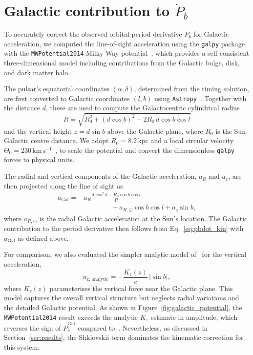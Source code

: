 \documentclass[
    floats,
    floatfix,
    amssymb,
    prd,
    twocolumn,
    superscriptaddress,
    nofootinbib,
    unicode,
    colorlinks=true,
    linktocpage=true
]{revtex4-2}
\begin{document}
\section{Galactic contribution to $\dot{P}_b$}
\label{app:pbdot_gal}

To accurately correct the observed orbital period derivative $\dot{P}_b$ 
for Galactic acceleration, we computed the line-of-sight acceleration 
using the \texttt{galpy} package with the 
\texttt{MWPotential2014} Milky Way potential~\cite{Bovy:2014vfa}, which provides a 
self-consistent three-dimensional model including contributions from the 
Galactic bulge, disk, and dark matter halo.

The pulsar's equatorial coordinates $(\alpha, \delta)$, determined from 
the timing solution, are first converted to Galactic coordinates $(l, b)$ 
using \texttt{Astropy}~\cite{2022ApJ...935..167A}. Together with the 
distance $d$, these are used to compute the Galactocentric cylindrical 
radius
\begin{equation}
    R = \sqrt{R_0^2 + (d\cos b)^2 - 2R_0\, d\cos b\cos l}
    \label{eq:galR}
\end{equation}
and the vertical height $z = d \sin b$ above the Galactic plane, where 
$R_0$ is the Sun--Galactic centre distance. We adopt 
$R_0 = 8.2\,\mathrm{kpc}$ and a local circular velocity $\Theta_0 = 
230\,\mathrm{km\,s^{-1}}$~\cite{10.1093/mnras/stac3529,2023A&A...676A.134P}, to scale the potential and 
convert the dimensionless \texttt{galpy} forces to physical units.

The radial and vertical components of the Galactic acceleration, $a_R$ 
and $a_z$, are then projected along the line of sight as
\begin{align}
    a_\mathrm{Gal} = &a_R \frac{d\cos^2 b - R_0 \cos b \cos l}{R} \nonumber \\
    &\qquad \qquad + a_{R,\odot}\cos b \cos l + a_z \sin b,
    \label{eq:agal_proj}
\end{align}
where $a_{R,\odot}$ is the radial Galactic acceleration at the Sun's 
location. The Galactic contribution to the period derivative then follows 
from Eq.~\eqref{eq:pbdot_kin} with $a_\mathrm{Gal}$ as defined above.

For comparison, we also evaluated the simpler analytic model of~\citet{2009MNRAS.400..805L} for the vertical acceleration,
\begin{equation}
    a_\mathrm{z,\,analytic} = -\frac{K_z(z)}{c}\,|\sin b|,
    \label{eq:kz}
\end{equation}
where $K_z(z)$ parameterises the vertical force near the Galactic plane. 
This model captures the overall vertical structure but neglects radial 
variations and the detailed Galactic potential. As shown in 
Figure~\ref{fig:galactic_potential}, the \texttt{MWPotential2014} result 
exceeds the analytic $K_z$ estimate in amplitude, which reverses the sign 
of $\dot{P}_b^\mathrm{Gal}$ compared to~\citet{Freire:2012}. Nevertheless, 
as discussed in Section~\ref{sec:results}, the Shklovskii term dominates 
the kinematic correction for this system.
\end{document}

